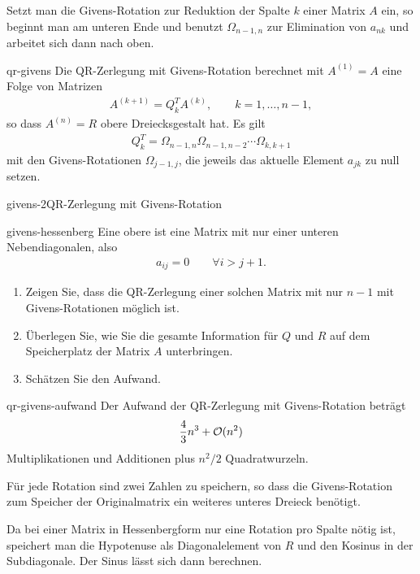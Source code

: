 \begin{remark}
  Setzt man die Givens-Rotation zur Reduktion der Spalte $k$ einer
  Matrix $A$ ein, so beginnt man am unteren Ende und benutzt
  $\Omega_{n-1,n}$ zur Elimination von $a_{nk}$ und arbeitet sich dann nach oben.
\end{remark}

\begin{Lemma}{qr-givens}
  Die QR-Zerlegung mit Givens-Rotation berechnet mit $A^{(1)} = A$ eine Folge von Matrizen
  \begin{gather}
    A^{(k+1)} = Q_k^T A^{(k)}, \qquad k=1,\dots,n-1,
  \end{gather}
  so dass $A^{(n)}=R$ obere Dreiecksgestalt hat. Es gilt
  \begin{gather}
    Q_k^T = \Omega_{n-1,n}\Omega_{n-1,n-2}\cdots\Omega_{k,k+1}
  \end{gather}
  mit den Givens-Rotationen $\Omega_{j-1,j}$, die jeweils das aktuelle
  Element $a_{jk}$ zu null setzen.
\end{Lemma}

\begin{Algorithmus*}{givens-2}{QR-Zerlegung mit Givens-Rotation}
  
\end{Algorithmus*}

\begin{Aufgabe}{givens-hessenberg}
  Eine obere  ist eine Matrix mit nur einer
  unteren Nebendiagonalen, also
  \begin{gather}
    a_{ij} = 0\qquad \forall i>j+1.
  \end{gather}
  \begin{enumerate}
  \item Zeigen Sie, dass die QR-Zerlegung einer solchen Matrix mit nur
    $n-1$ mit Givens-Rotationen möglich ist.
  \item Überlegen Sie, wie Sie die gesamte Information für $Q$ und $R$
    auf dem Speicherplatz der Matrix $A$ unterbringen.
  \item Schätzen Sie den Aufwand.
  \end{enumerate}
\end{Aufgabe}

\begin{Lemma}{qr-givens-aufwand}
  Der Aufwand der QR-Zerlegung mit Givens-Rotation beträgt
  \begin{gather}
    \frac43 n^3 + \mathcal O(n^2)
  \end{gather}
  Multiplikationen und Additionen plus $n^2/2$ Quadratwurzeln.

  Für jede Rotation sind zwei Zahlen zu speichern, so dass die
  Givens-Rotation zum Speicher der Originalmatrix ein weiteres unteres
  Dreieck benötigt.

  Da bei einer Matrix in Hessenbergform nur eine Rotation pro Spalte
  nötig ist, speichert man die Hypotenuse als Diagonalelement von $R$
  und den Kosinus in der Subdiagonale. Der Sinus lässt sich dann
  berechnen.
\end{Lemma}



